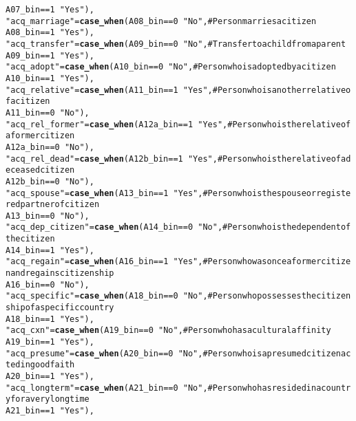 \documentclass{article}\usepackage[]{graphicx}\usepackage[]{xcolor}
\makeatletter
\newcommand{\hlstr}[1]{\textcolor[rgb]{0.192,0.494,0.8}{#1}}%
\newcommand{\hlkwd}[1]{\textcolor[rgb]{0.737,0.353,0.396}{\textbf{#1}}}%
\newenvironment{kframe}{%
 \def\at@end@of@kframe{}%
 \ifinner\ifhmode%
  \def\at@end@of@kframe{\end{minipage}}%
  \begin{minipage}{\columnwidth}%
 \fi\fi%
 \def\FrameCommand##1{\hskip\@totalleftmargin \hskip-\fboxsep
 \colorbox{shadecolor}{##1}\hskip-\fboxsep
     \hskip-\linewidth \hskip-\@totalleftmargin \hskip\columnwidth}%
 \MakeFramed {\advance\hsize-\width
   \@totalleftmargin\z@ \linewidth\hsize
   \@setminipage}}%
 {\par\unskip\endMakeFramed%
 \at@end@of@kframe}
\newenvironment{knitrout}{}{} %
\makeatother
\begin{document}
\begin{knitrout}
\begin{kframe}
\begin{alltt}
                                     A07_bin == 1 ~ \hlstr{"Yes"}),
         \hlstr{"acq_marriage"} = \hlkwd{case_when}(A08_bin == 0 ~ \hlstr{"No"}, # Person marries a citizen
                                    A08_bin == 1 ~ \hlstr{"Yes"}),
         \hlstr{"acq_transfer"} = \hlkwd{case_when}(A09_bin == 0 ~ \hlstr{"No"}, # Transfer to a child from a parent
                                    A09_bin == 1 ~ \hlstr{"Yes"}),
         \hlstr{"acq_adopt"} = \hlkwd{case_when}(A10_bin == 0 ~ \hlstr{"No"}, # Person who is adopted by a citizen
                                 A10_bin == 1 ~ \hlstr{"Yes"}),
         \hlstr{"acq_relative"} = \hlkwd{case_when}(A11_bin == 1 ~ \hlstr{"Yes"}, # Person who is another relative of a citizen
                                    A11_bin == 0 ~ \hlstr{"No"}),
         \hlstr{"acq_rel_former"} = \hlkwd{case_when}(A12a_bin == 1 ~ \hlstr{"Yes"}, # Person who is the relative of a former citizen
                                      A12a_bin == 0 ~ \hlstr{"No"}),
         \hlstr{"acq_rel_dead"} = \hlkwd{case_when}(A12b_bin == 1 ~ \hlstr{"Yes"}, # Person who is the relative of a deceased citizen
                                    A12b_bin == 0 ~ \hlstr{"No"}),
         \hlstr{"acq_spouse"} = \hlkwd{case_when}(A13_bin == 1 ~ \hlstr{"Yes"}, # Person who is the spouse or registered partner of citizen
                                  A13_bin == 0 ~ \hlstr{"No"}),
         \hlstr{"acq_dep_citizen"} = \hlkwd{case_when}(A14_bin == 0 ~ \hlstr{"No"}, # Person who is the dependent of the citizen
                                       A14_bin == 1 ~ \hlstr{"Yes"}),
         \hlstr{"acq_regain"} = \hlkwd{case_when}(A16_bin == 1 ~ \hlstr{"Yes"}, # Person who was once a former citizen and regains citizenship
                                  A16_bin == 0 ~ \hlstr{"No"}), 
         \hlstr{"acq_specific"} = \hlkwd{case_when}(A18_bin == 0 ~ \hlstr{"No"}, # Person who possesses the citizenship of a specific country
                                    A18_bin == 1 ~ \hlstr{"Yes"}),
         \hlstr{"acq_cxn"} = \hlkwd{case_when}(A19_bin == 0 ~ \hlstr{"No"}, # Person who has a cultural affinity
                               A19_bin == 1 ~ \hlstr{"Yes"}),
         \hlstr{"acq_presume"} = \hlkwd{case_when}(A20_bin == 0 ~ \hlstr{"No"}, # Person who is a presumed citizen acted in good faith
                                   A20_bin == 1 ~ \hlstr{"Yes"}),
         \hlstr{"acq_longterm"} = \hlkwd{case_when}(A21_bin == 0 ~ \hlstr{"No"}, # Person who has resided in a country for a very long time
                                    A21_bin == 1 ~ \hlstr{"Yes"}),

\end{alltt}
\end{kframe}
\end{knitrout}
\end{document}
